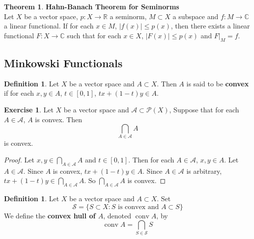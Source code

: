 \documentclass[12pt]{amsart}
\theoremstyle{definition}
\newtheorem{defn}[definition]{Definition}
\newtheorem{thm}[definition]{Theorem}
\newtheorem{ex}[definition]{Exercise}
\newcommand{\C}{\mathbb{C}}
\newcommand{\R}{\mathbb{R}}
\newcommand{\MA}{\mathcal{A}}
\newcommand{\MS}{\mathcal{S}}
\newcommand{\MP}{\mathcal{P}}
\newcommand{\tbf}[1]{\textbf{#1}}
\DeclareMathOperator{\cnv}{conv}
\DeclareMathOperator*{\0}{\mbf{0}}
\DeclareMathOperator*{\1}{\mbf{1}}
\begin{document}
	\begin{thm}\tbf{Hahn-Banach Theorem for Seminorms}\\
		Let $X$ be a vector space, $p:X \rightarrow \R$ a seminorm, $M \subset X$ a subspace and $f:M \rightarrow \C$ a linear functional. If for each $x \in M$, $\vert f(x) \vert \leq p(x)$, then there exists a linear functional $F:X \rightarrow \C$ such that for each $x \in X$, $\vert F(x) \vert \leq p(x)$ and $F|_{M}=f$.
	\end{thm}	






















	
	\newpage
	\subsection{Minkowski Functionals}

	\begin{defn}
		Let $X$ be a vector space and $A \subset X$. Then $A$ is said to be \tbf{convex} if for each $x, y \in A$, $t \in [0,1]$, $tx +(1-t)y \in A$.
	\end{defn}

	\begin{ex}
		Let $X$ be a vector space and $\MA \subset \MP(X)$, Suppose that for each $A \in \MA$, $A$ is convex. Then $$\bigcap_{A \in \MA} A$$ is convex.
	\end{ex}

	\begin{proof}
		Let $x,y \in \bigcap\limits_{A \in \MA} A$ and $t \in [0,1]$. Then for each $A \in \MA$, $x,y \in A$. Let $A \in \MA$. Since $A$ is convex, $tx + (1-t)y \in A$. Since $A \in \MA$ is arbitrary, $tx + (1-t)y \in \bigcap\limits_{A \in \MA} A$. So $\bigcap\limits_{A \in \MA} A $ is convex.
	\end{proof}

	\begin{defn}
		Let $X$ be a vector space and $A \subset X$. Set 
		$$\MS = \{S \subset X: S \text{ is convex and } A \subset S\}$$ 
		We define the \tbf{convex hull of $A$}, denoted $\cnv A$, by $$\cnv A = \bigcap_{S \in \MS}S$$
	\end{defn}
\end{document}
